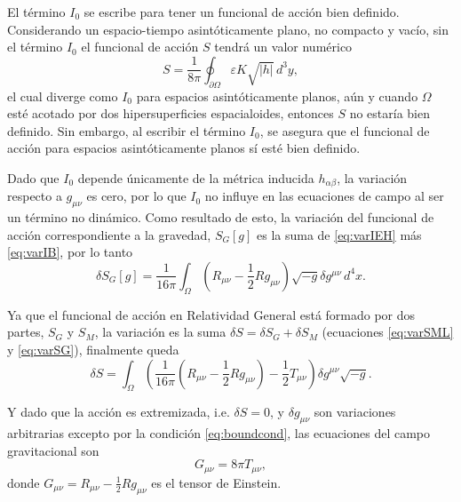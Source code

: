 El t\'{e}rmino $I_{0}$ se escribe para tener un funcional de acci\'{o}n bien definido. Considerando un espacio-tiempo asint\'{o}ticamente plano, no compacto y vac\'{i}o, sin el t\'{e}rmino $I_{0}$ el funcional de acci\'{o}n $S$ tendr\'{a} un valor num\'{e}rico
%
\begin{equation}
\label{eq:SGI0}
S = \frac{1}{8 \pi} \oint_{\partial \Omega} \varepsilon K \sqrt{|h|} \, d^{3} y,
\end{equation}
%
el cual diverge como $I_{0}$ para espacios asint\'{o}ticamente planos, a\'{u}n y cuando $\Omega$ est\'{e} acotado por dos hipersuperficies espacialoides, entonces $S$ no estar\'{i}a bien definido. Sin embargo, al escribir el t\'{e}rmino $I_{0}$, se asegura que el funcional de acci\'{o}n para espacios asint\'{o}ticamente planos s\'{i} est\'{e} bien definido.

Dado que $I_{0}$ depende \'{u}nicamente de la m\'{e}trica inducida $h_{\alpha \beta}$, la variaci\'{o}n respecto a $g_{\mu \nu}$ es cero, por lo que $I_{0}$ no influye en las ecuaciones de campo al ser un t\'{e}rmino no din\'{a}mico. Como resultado de esto, la variaci\'{o}n del funcional de acci\'{o}n correspondiente a la gravedad, $S_{G} [g]$ es la suma de \eqref{eq:varIEH} m\'{a}s \eqref{eq:varIB}, por lo tanto
%
\begin{equation}
\label{eq:varSG}
\delta S_{G} [g] = \frac{1}{16 \pi} \int_{\Omega} \left( R_{\mu \nu} - \frac{1}{2} R g_{\mu \nu} \right) \sqrt{-g} \delta g^{\mu \nu} \, d^{4} x.
\end{equation}

Ya que el funcional de acci\'{o}n en Relatividad General est\'{a} formado por dos partes, $S_{G}$ y $S_{M}$, la variaci\'{o}n es la suma $\delta S = \delta S_{G} + \delta S_{M}$ (ecuaciones \eqref{eq:varSML} y \eqref{eq:varSG}), finalmente queda
%
\begin{equation}
\label{eq:varSSGSM}
\delta S = \int_{\Omega} \left( \frac{1}{16 \pi} (R_{\mu \nu} - \frac{1}{2} R g_{\mu \nu}) - \frac{1}{2} T_{\mu \nu} \right) \delta g^{\mu \nu} \sqrt{-g}.
\end{equation}

Y dado que la acci\'{o}n es extremizada, i.e. $\delta S = 0$, y $\delta g_{\mu \nu}$ son variaciones arbitrarias excepto por la condici\'{o}n \eqref{eq:boundcond}, las ecuaciones del campo gravitacional son
%
\begin{equation}
\label{eq:Einstein}
G_{\mu \nu} = 8 \pi T_{\mu \nu},
\end{equation}
%
donde $G_{\mu \nu} = R_{\mu \nu} - \frac{1}{2} R g_{\mu \nu}$ es el tensor de Einstein.

